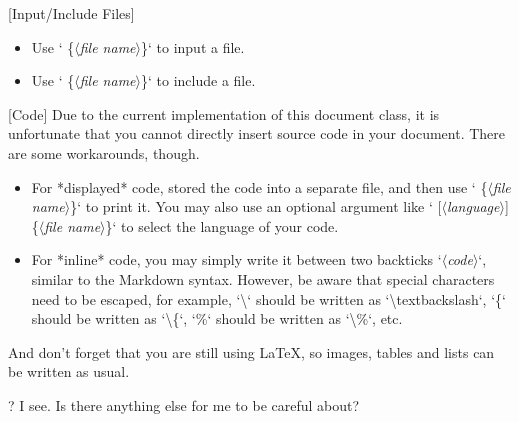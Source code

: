 \documentclass[%
  use style = classical,
  scroll,
]{Q-and-A}
\newcommand{\meta}[1]{$\langle${\normalfont\itshape#1}$\rangle$}
\begin{document}
  [Input/Include Files]
  \begin{itemize}
    \item Use `\textcolon\textcolon{} \{\meta{file name}\}` to input a file.
    \item Use `\textcolon\textcolon\textcolon{} \{\meta{file name}\}` to include a file.
  \end{itemize}

  [Code]
  Due to the current implementation of this document class, it is unfortunate that you cannot directly insert source code in your document. There are some workarounds, though.
  \begin{itemize}
    \item For *displayed* code, stored the code into a separate file, and then use `\texteqsign\texteqsign{} \{\meta{file name}\}` to print it. You may also use an optional argument like `\texteqsign\texteqsign{} [\meta{language}] \{\meta{file name}\}` to select the language of your code.
    \item For *inline* code, you may simply write it between two backticks `\textbacktick\meta{code}\textbacktick`, similar to the Markdown syntax. However, be aware that special characters need to be escaped, for example, `\textbackslash` should be written as `\textbackslash textbackslash`, `\{` should be written as `\textbackslash\{`, `\%` should be written as `\textbackslash\%`, etc.
  \end{itemize}

  And don't forget that you are still using \LaTeX, so images, tables and lists can be written as usual.

?
  I see. Is there anything else for me to be careful about?
\end{document}
